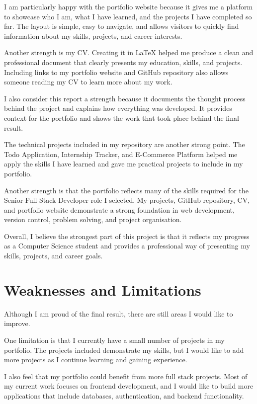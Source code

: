 \documentclass[12pt,a4paper]{article}
\begin{document}
I am particularly happy with the portfolio website because it gives me a platform to showcase who I am, what I have learned, and the projects I have completed so far. The layout is simple, easy to navigate, and allows visitors to quickly find information about my skills, projects, and career interests.

Another strength is my CV. Creating it in LaTeX helped me produce a clean and professional document that clearly presents my education, skills, and projects. Including links to my portfolio website and GitHub repository also allows someone reading my CV to learn more about my work.

I also consider this report a strength because it documents the thought process behind the project and explains how everything was developed. It provides context for the portfolio and shows the work that took place behind the final result.

The technical projects included in my repository are another strong point. The Todo Application, Internship Tracker, and E-Commerce Platform helped me apply the skills I have learned and gave me practical projects to include in my portfolio.

Another strength is that the portfolio reflects many of the skills required for the Senior Full Stack Developer role I selected. My projects, GitHub repository, CV, and portfolio website demonstrate a strong foundation in web development, version control, problem solving, and project organisation.


Overall, I believe the strongest part of this project is that it reflects my progress as a Computer Science student and provides a professional way of presenting my skills, projects, and career goals.


\section{Weaknesses and Limitations}

Although I am proud of the final result, there are still areas I would like to improve.

One limitation is that I currently have a small number of projects in my portfolio. The projects included demonstrate my skills, but I would like to add more projects as I continue learning and gaining experience.

I also feel that my portfolio could benefit from more full stack projects. Most of my current work focuses on frontend development, and I would like to build more applications that include databases, authentication, and backend functionality.
\end{document}
